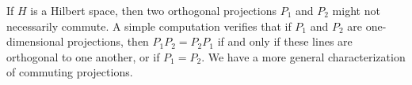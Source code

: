 If $H$ is a Hilbert space, then two orthogonal projections $P_1$ and $P_2$ might not necessarily commute. A simple computation verifies that if $P_1$ and $P_2$ are one-dimensional projections, then $P_1 P_2 = P_2 P_1$ if and only if these lines are orthogonal to one another, or if $P_1 = P_2$. We have a more general characterization of commuting projections.
%
%
%
%

